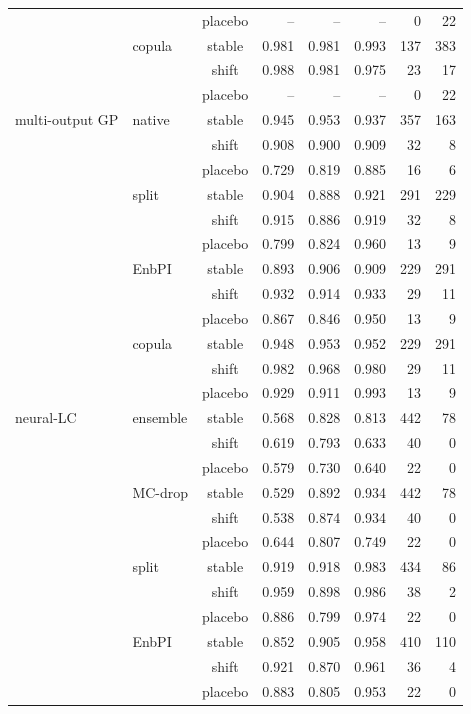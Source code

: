 {\begin{longtable}{@{}llcrrrrr@{}}
 &  & placebo & -- & -- & -- & 0 & 22 \\
 & copula & stable & 0.981 & 0.981 & 0.993 & 137 & 383 \\
 &  & shift & 0.988 & 0.981 & 0.975 & 23 & 17 \\
 &  & placebo & -- & -- & -- & 0 & 22 \\
\addlinespace[2pt]
multi-output GP & native & stable & 0.945 & 0.953 & 0.937 & 357 & 163 \\
 &  & shift & 0.908 & 0.900 & 0.909 & 32 & 8 \\
 &  & placebo & 0.729 & 0.819 & 0.885 & 16 & 6 \\
 & split & stable & 0.904 & 0.888 & 0.921 & 291 & 229 \\
 &  & shift & 0.915 & 0.886 & 0.919 & 32 & 8 \\
 &  & placebo & 0.799 & 0.824 & 0.960 & 13 & 9 \\
 & EnbPI & stable & 0.893 & 0.906 & 0.909 & 229 & 291 \\
 &  & shift & 0.932 & 0.914 & 0.933 & 29 & 11 \\
 &  & placebo & 0.867 & 0.846 & 0.950 & 13 & 9 \\
 & copula & stable & 0.948 & 0.953 & 0.952 & 229 & 291 \\
 &  & shift & 0.982 & 0.968 & 0.980 & 29 & 11 \\
 &  & placebo & 0.929 & 0.911 & 0.993 & 13 & 9 \\
\addlinespace[2pt]
neural-LC & ensemble & stable & 0.568 & 0.828 & 0.813 & 442 & 78 \\
 &  & shift & 0.619 & 0.793 & 0.633 & 40 & 0 \\
 &  & placebo & 0.579 & 0.730 & 0.640 & 22 & 0 \\
 & MC-drop & stable & 0.529 & 0.892 & 0.934 & 442 & 78 \\
 &  & shift & 0.538 & 0.874 & 0.934 & 40 & 0 \\
 &  & placebo & 0.644 & 0.807 & 0.749 & 22 & 0 \\
 & split & stable & 0.919 & 0.918 & 0.983 & 434 & 86 \\
 &  & shift & 0.959 & 0.898 & 0.986 & 38 & 2 \\
 &  & placebo & 0.886 & 0.799 & 0.974 & 22 & 0 \\
 & EnbPI & stable & 0.852 & 0.905 & 0.958 & 410 & 110 \\
 &  & shift & 0.921 & 0.870 & 0.961 & 36 & 4 \\
 &  & placebo & 0.883 & 0.805 & 0.953 & 22 & 0 \\

\end{longtable}}
